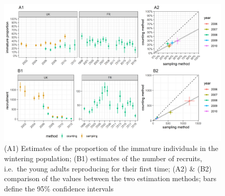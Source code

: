 \documentclass[
  english,
]{article}
\begin{document}
\begin{figure}[H]

{\centering \includegraphics[width=1\linewidth]{../Output/plot_8} 

}

\caption{(A1) Estimates of the proportion of the immature individuals in the wintering population; (B1) estimates of the number of recruits, i.e.~the young adults reproducing for their first time; (A2) \& (B2) comparison of the values between the two estimation methods; bars define the 95\% confidence intervals}\label{fig:sup}
\end{figure}
\end{document}
